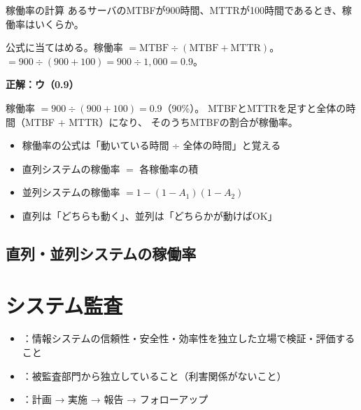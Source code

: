 \begin{reidai}{稼働率の計算}
あるサーバのMTBFが900時間、MTTRが100時間であるとき、稼働率はいくらか。

\end{reidai}

\begin{shishin}
公式に当てはめる。稼働率 $= \text{MTBF} \div (\text{MTBF} + \text{MTTR})$。
$= 900 \div (900 + 100) = 900 \div 1{,}000 = 0.9$。
\end{shishin}

\begin{kaitou}
\textbf{正解：ウ（0.9）}

稼働率 $= 900 \div (900 + 100) = 0.9$（90\%）。
MTBFとMTTRを足すと全体の時間（MTBF + MTTR）になり、
そのうちMTBFの割合が稼働率。
\end{kaitou}

\begin{minuki}[見抜き方]
\begin{itemize}
  \item 稼働率の公式は「動いている時間 ÷ 全体の時間」と覚える
  \item 直列システムの稼働率 $=$ 各稼働率の積
  \item 並列システムの稼働率 $= 1 - (1 - A_1)(1 - A_2)$
  \item 直列は「どちらも動く」、並列は「どちらかが動けばOK」
\end{itemize}
\end{minuki}

\subsection{直列・並列システムの稼働率}

\begin{hikaku}[直列と並列の稼働率]
\end{hikaku}

\section{システム監査}

\begin{teigi}[システム監査の基本]
\begin{itemize}
  \item {}：情報システムの信頼性・安全性・効率性を独立した立場で検証・評価すること
  \item {}：被監査部門から独立していること（利害関係がないこと）
  \item {}：計画 → 実施 → 報告 → フォローアップ
\end{itemize}
\end{teigi}

